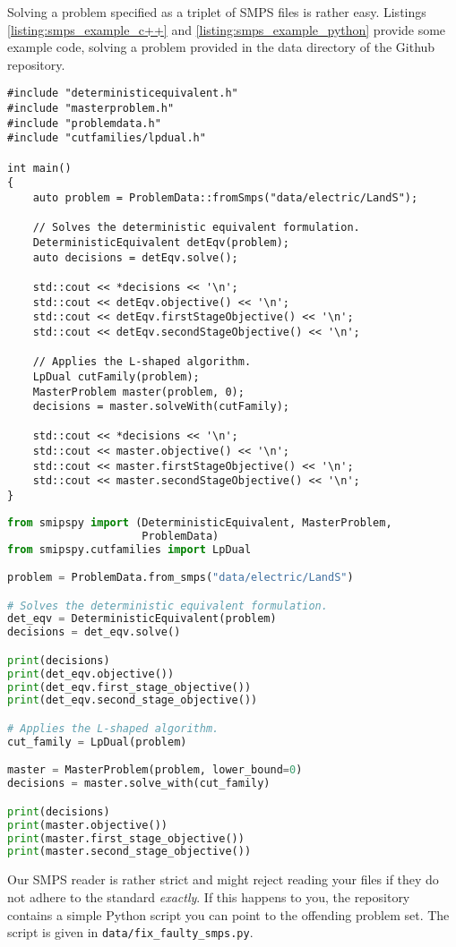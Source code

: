 \documentclass[12pt, english]{article}
\begin{document}
Solving a problem specified as a triplet of SMPS files is rather easy. Listings \ref{listing:smps_example_c++} and \ref{listing:smps_example_python} provide some example code, solving a problem provided in the data directory of the Github repository.
\begin{lstlisting}[caption={Solving an SMPS problem in C++.},
                   label={listing:smps_example_c++}]
#include "deterministicequivalent.h"
#include "masterproblem.h"
#include "problemdata.h"
#include "cutfamilies/lpdual.h"

int main()
{
	auto problem = ProblemData::fromSmps("data/electric/LandS");
	
	// Solves the deterministic equivalent formulation.
	DeterministicEquivalent detEqv(problem);
	auto decisions = detEqv.solve();
	
	std::cout << *decisions << '\n';
	std::cout << detEqv.objective() << '\n';
	std::cout << detEqv.firstStageObjective() << '\n';
	std::cout << detEqv.secondStageObjective() << '\n';
	
	// Applies the L-shaped algorithm.
	LpDual cutFamily(problem);
	MasterProblem master(problem, 0);
	decisions = master.solveWith(cutFamily);
	
	std::cout << *decisions << '\n';
	std::cout << master.objective() << '\n';
	std::cout << master.firstStageObjective() << '\n';
	std::cout << master.secondStageObjective() << '\n';
}
\end{lstlisting}
\begin{lstlisting}[caption={Solving an SMPS problem in Python.},
                   label={listing:smps_example_python},
                   language={Python}]
from smipspy import (DeterministicEquivalent, MasterProblem, 
                     ProblemData)
from smipspy.cutfamilies import LpDual

problem = ProblemData.from_smps("data/electric/LandS")

# Solves the deterministic equivalent formulation.
det_eqv = DeterministicEquivalent(problem)
decisions = det_eqv.solve()

print(decisions)
print(det_eqv.objective())
print(det_eqv.first_stage_objective())
print(det_eqv.second_stage_objective())

# Applies the L-shaped algorithm.
cut_family = LpDual(problem)

master = MasterProblem(problem, lower_bound=0)
decisions = master.solve_with(cut_family)

print(decisions)
print(master.objective())
print(master.first_stage_objective())
print(master.second_stage_objective())
\end{lstlisting}
Our SMPS reader is rather strict and might reject reading your files if they do not adhere to the standard \textit{exactly}. If this happens to you, the repository contains a simple Python script you can point to the offending problem set. The script is given in \texttt{data/fix\_faulty\_smps.py}.
\end{document}
